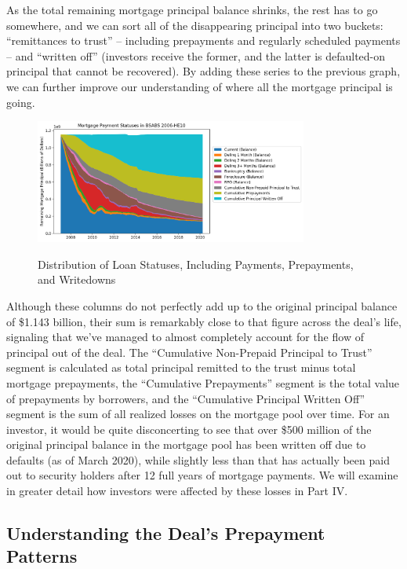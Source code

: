 \documentclass[12pt]{article}
\begin{document}
	As the total remaining mortgage principal balance shrinks, the rest has to go somewhere, and we can sort all of the disappearing principal into two buckets: “remittances to trust” – including prepayments and regularly scheduled payments – and “written off” (investors receive the former, and the latter is defaulted-on principal that cannot be recovered). By adding these series to the previous graph, we can further improve our understanding of where all the mortgage principal is going.


\begin{figure}[h]
	\centering
	\caption{Distribution of Loan Statuses, Including Payments, Prepayments, and Writedowns}
	\includegraphics[width=0.8\textwidth]{../figures/stackplot_delinq_status_with_writeoffs}
	\label{fig:stackplot_delinq_status_with_writeoffs}
\end{figure}

Although these columns do not perfectly add up to the original principal balance of \$1.143 billion, their sum is remarkably close to that figure across the deal’s life, signaling that we’ve managed to almost completely account for the flow of principal out of the deal. The “Cumulative Non-Prepaid Principal to Trust” segment is calculated as total principal remitted to the trust minus total mortgage prepayments, the “Cumulative Prepayments” segment is the total value of prepayments by borrowers, and the “Cumulative Principal Written Off” segment is the sum of all realized losses on the mortgage pool over time. For an investor, it would be quite disconcerting to see that over \$500 million of the original principal balance in the mortgage pool has been written off due to defaults (as of March 2020), while slightly less than that has actually been paid out to security holders after 12 full years of mortgage payments. We will examine in greater detail how investors were affected by these losses in Part IV.


\subsection*{Understanding the Deal's Prepayment Patterns}
\end{document}

